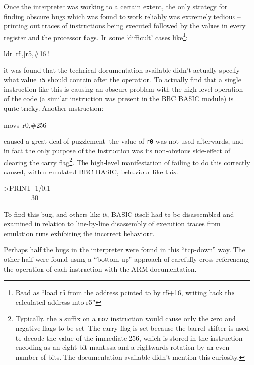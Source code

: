 Once the interpreter was working to a certain extent, the only strategy for finding obscure bugs which was found to work reliably was extremely tedious -- printing out traces of instructions being executed followed by the values in every register and the processor flags. In some `difficult' cases like\footnote{Read as ``load r5 from the address pointed to by r5+16, writing back the calculated address into r5''}:

\begin{code}
ldr~r5,[r5,\#16]!
\end{code}

it was found that the technical documentation available didn't actually specify what value {\tt r5} should contain after the operation. To actually find that a single instruction like this is causing an obscure problem with the high-level operation of the code (a similar instruction was present in the BBC BASIC module) is quite tricky. Another instruction:

\begin{code}
movs~r0,\#256
\end{code}

caused a great deal of puzzlement: the value of {\tt r0} was not used afterwards, and in fact the only purpose of the instruction was its non-obvious side-effect of clearing the carry flag\footnote{Typically, the {\tt s} suffix on a {\tt mov} instruction would cause only the zero and negative flags to be set. The carry flag is set because the barrel shifter is used to decode the value of the immediate 256, which is stored in the instruction encoding as an eight-bit mantissa and a rightwards rotation by an even number of bits. The documentation available didn't mention this curiosity.}. The high-level manifestation of failing to do this correctly caused, within emulated BBC BASIC, behaviour like this:

\begin{code}
>PRINT~1/0.1\\
~~~~~~~~30
\end{code}

To find this bug, and others like it, BASIC itself had to be disassembled and examined in relation to line-by-line disassembly of execution traces from emulation runs exhibiting the incorrect behaviour.

Perhaps half the bugs in the interpreter were found in this ``top-down'' way. The other half were found using a ``bottom-up'' approach of carefully cross-referencing the operation of each instruction with the ARM documentation.


